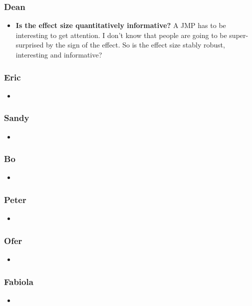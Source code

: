 \begin{frame}
        \label{frame:dean3}
    \frametitle{Dean}
    \begin{itemize}
        \item \textbf{Is the effect size quantitatively informative?}   A JMP has to be interesting to get attention. I don’t know that people are going to be super-surprised by the sign of the effect. So is the effect size stably robust, interesting and informative?
    \end{itemize}
\end{frame}

\begin{frame}
        \label{frame:Eric}
    \frametitle{Eric}
    \begin{itemize}
        \item 
    \end{itemize}
\end{frame}

\begin{frame}
        \label{frame:Sandy}
    \frametitle{Sandy}
    \begin{itemize}
        \item 
    \end{itemize}
\end{frame}

\begin{frame}
        \label{frame:Bo}
    \frametitle{Bo}
    \begin{itemize}
        \item 
    \end{itemize}
\end{frame}

\begin{frame}
        \label{frame:Peter}
    \frametitle{Peter}
    \begin{itemize}
        \item 
    \end{itemize}
\end{frame}

\begin{frame}
        \label{frame:Ofer}
    \frametitle{Ofer}
    \begin{itemize}
        \item 
    \end{itemize}
\end{frame}

\begin{frame}
    \label{frame:fabiola}
    \frametitle{Fabiola}
    \begin{itemize}
        \item 
    \end{itemize}
\end{frame}
